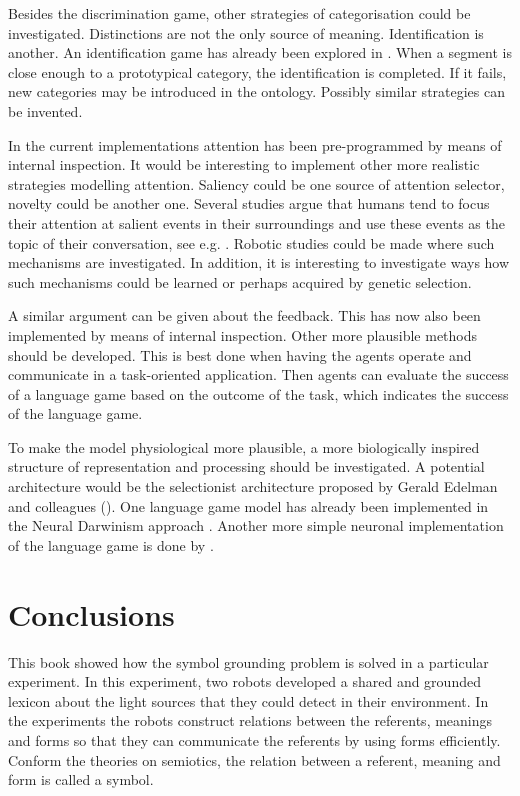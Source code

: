 Besides the discrimination game, other strategies of categorisation could be investigated. Distinctions are not the only source of meaning. Identification is another. An identification game has already been explored in \citet{vogt:1999a,vogt:2000}. When a segment is close enough to a prototypical category, the identification is completed. If it fails, new categories may be introduced in the ontology. Possibly similar strategies can be invented.


In the current implementations attention has been pre-programmed by means of internal inspection. It would be interesting to implement other more realistic strategies modelling attention. Saliency could be one source of attention selector, novelty could be another one. Several studies argue that humans tend to focus their attention at salient events in their surroundings and use these events as the topic of their conversation, see e.g. \citealt{dessalles:2000}. Robotic studies could be made where such mechanisms are investigated. In addition, it is interesting to investigate ways how such mechanisms could be learned or perhaps acquired by genetic selection. 

A similar argument can be given about the feedback. This has now also been implemented by means of internal inspection. Other more plausible methods should be developed. This is best done when having the agents operate and communicate in a task-oriented application. Then agents can evaluate the success of a language game based on the outcome of the task, which indicates the success of the language game. 


To make the model physiological more plausible, a more biologically inspired structure of representation and processing should be investigated. A potential architecture would be the selectionist architecture proposed by Gerald Edelman and colleagues (\citeyear{edelman:1987}). One language game model has already been implemented in the Neural Darwinism approach \citep{popescu-belis:1997}. Another more simple neuronal implementation of the language game is done by \citet{dircksstoness:1999}.

\section{Conclusions}

This book showed how the symbol grounding problem is solved in a particular experiment. In this experiment, two robots developed a shared and grounded lexicon about the light sources that they could detect in their environment. In the experiments the robots construct relations between the referents, meanings and forms so that they can communicate the referents by using forms efficiently. Conform the theories on semiotics, the relation between a referent, meaning and form is called a symbol.

